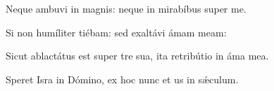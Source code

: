 \item {}

\item Neque ambuvi in magnis:\psstar{} neque in mirabíbus super me.

\item Si non humíliter tiébam:\psstar{} sed exaltávi ámam meam:

\item Sicut ablactátus est super tre sua,\psstar{} ita retribútio in áma mea.

\item Speret Isra in Dómino,\psstar{} ex hoc nunc et us in sǽculum.
